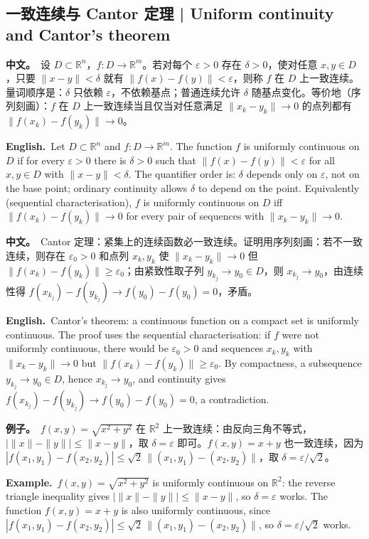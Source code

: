\documentclass[UTF8,11pt,a4paper]{ctexart}
\newcommand{\BOTH}[2]{\par\noindent\textbf{中文。}\ #1\par\noindent\textbf{English.}\ #2\par}
\newcommand{\EX}[2]{\par\noindent\textbf{例子。}\ #1\par\noindent\textbf{Example.}\ #2\par}
\begin{document}
\subsection{一致连续与 Cantor 定理 | Uniform continuity and Cantor's theorem}
\BOTH{设 $D\subset\mathbb R^n$，$f:D\to\mathbb R^m$。若对每个 $\varepsilon>0$ 存在 $\delta>0$，使对任意 $x,y\in D$，只要 $\|x-y\|<\delta$ 就有 $\|f(x)-f(y)\|<\varepsilon$，则称 $f$ 在 $D$ 上一致连续。量词顺序是：$\delta$ 只依赖 $\varepsilon$，不依赖基点；普通连续允许 $\delta$ 随基点变化。等价地（序列刻画）：$f$ 在 $D$ 上一致连续当且仅当对任意满足 $\|x_k-y_k\|\to0$ 的点列都有 $\|f(x_k)-f(y_k)\|\to0$。}{Let $D\subset\mathbb R^n$ and $f:D\to\mathbb R^m$. The function $f$ is uniformly continuous on $D$ if for every $\varepsilon>0$ there is $\delta>0$ such that $\|f(x)-f(y)\|<\varepsilon$ for all $x,y\in D$ with $\|x-y\|<\delta$. The quantifier order is: $\delta$ depends only on $\varepsilon$, not on the base point; ordinary continuity allows $\delta$ to depend on the point. Equivalently (sequential characterisation), $f$ is uniformly continuous on $D$ iff $\|f(x_k)-f(y_k)\|\to0$ for every pair of sequences with $\|x_k-y_k\|\to0$.}
\BOTH{Cantor 定理：紧集上的连续函数必一致连续。证明用序列刻画：若不一致连续，则存在 $\varepsilon_0>0$ 和点列 $x_k,y_k$ 使 $\|x_k-y_k\|\to0$ 但 $\|f(x_k)-f(y_k)\|\ge\varepsilon_0$；由紧致性取子列 $y_{k_j}\to y_0\in D$，则 $x_{k_j}\to y_0$，由连续性得 $f(x_{k_j})-f(y_{k_j})\to f(y_0)-f(y_0)=0$，矛盾。}{Cantor's theorem: a continuous function on a compact set is uniformly continuous. The proof uses the sequential characterisation: if $f$ were not uniformly continuous, there would be $\varepsilon_0>0$ and sequences $x_k,y_k$ with $\|x_k-y_k\|\to0$ but $\|f(x_k)-f(y_k)\|\ge\varepsilon_0$. By compactness, a subsequence $y_{k_j}\to y_0\in D$, hence $x_{k_j}\to y_0$, and continuity gives $f(x_{k_j})-f(y_{k_j})\to f(y_0)-f(y_0)=0$, a contradiction.}
\EX{$f(x,y)=\sqrt{x^2+y^2}$ 在 $\mathbb R^2$ 上一致连续：由反向三角不等式，$\bigl|\|x\|-\|y\|\bigr|\le\|x-y\|$，取 $\delta=\varepsilon$ 即可。$f(x,y)=x+y$ 也一致连续，因为 $|f(x_1,y_1)-f(x_2,y_2)|\le\sqrt2\,\|(x_1,y_1)-(x_2,y_2)\|$，取 $\delta=\varepsilon/\sqrt2$。}{$f(x,y)=\sqrt{x^2+y^2}$ is uniformly continuous on $\mathbb R^2$: the reverse triangle inequality gives $\bigl|\|x\|-\|y\|\bigr|\le\|x-y\|$, so $\delta=\varepsilon$ works. The function $f(x,y)=x+y$ is also uniformly continuous, since $|f(x_1,y_1)-f(x_2,y_2)|\le\sqrt2\,\|(x_1,y_1)-(x_2,y_2)\|$, so $\delta=\varepsilon/\sqrt2$ works.}
\end{document}
